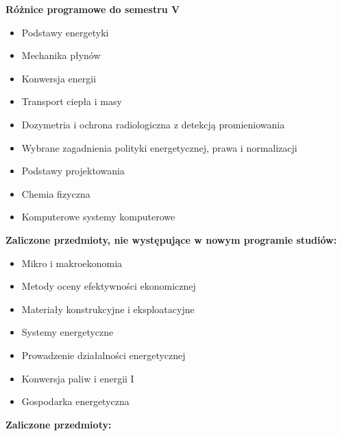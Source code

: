 \documentclass[a4paper,12pt]{article}
\begin{document}
\textbf{Różnice programowe do semestru V}
\begin{itemize}
\item Podstawy energetyki
\item Mechanika płynów
\item Konwersja energii
\item Transport ciepła i masy
\item Dozymetria i ochrona radiologiczna z detekcją promieniowania
\item Wybrane zagadnienia polityki energetycznej, prawa i normalizacji
\item Podstawy projektowania
\item Chemia fizyczna
\item Komputerowe systemy komputerowe
\end{itemize}
\vspace{20pt}
\textbf{Zaliczone przedmioty, nie występujące w nowym programie studiów:}
\begin{itemize}
\item Mikro i makroekonomia
\item Metody oceny efektywności ekonomicznej
\item Materiały konstrukcyjne i eksploatacyjne
\item Systemy energetyczne
\item Prowadzenie działalności energetycznej
\item Konwersja paliw i energii I
\item Gospodarka energetyczna
\end{itemize}
\newpage
\textbf{Zaliczone przedmioty:}
\end{document}
